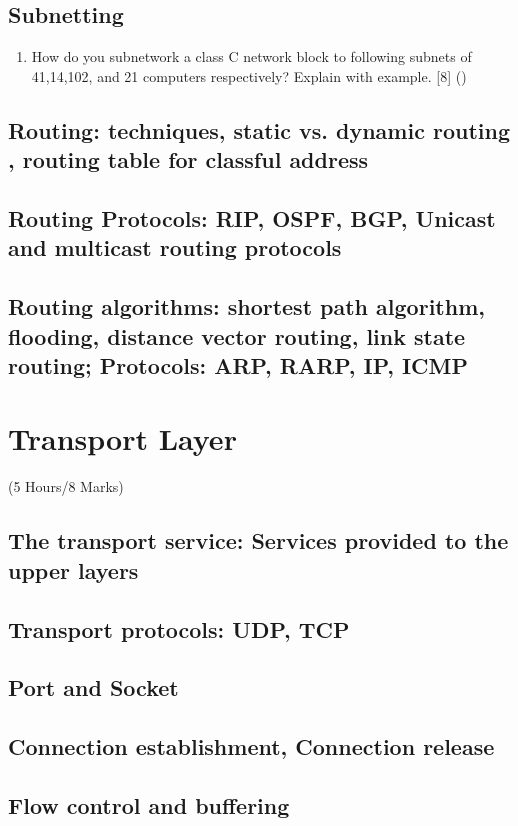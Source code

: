 \documentclass[12pt]{article}
\begin{document}
\subsection{Subnetting}
\begin{enumerate}[noitemsep, topsep=0pt]
	\item How do you subnetwork a class C network block to following subnets of 41,14,102, and 21 computers respectively? Explain with example. \hfill [8] ()
\end{enumerate}

\subsection{Routing: techniques, static vs. dynamic routing , routing table for classful address}
\subsection{Routing Protocols: RIP, OSPF, BGP, Unicast and multicast routing protocols}
\subsection{Routing algorithms: shortest path algorithm, flooding, distance vector routing, link state routing; Protocols: ARP, RARP, IP, ICMP}

\pagebreak
\section{Transport Layer}
\begin{center}(5 Hours/8 Marks)\end{center}
\subsection{The transport service: Services provided to the upper layers}
\subsection{Transport protocols: UDP, TCP}
\subsection{Port and Socket}
\subsection{Connection establishment, Connection release}
\subsection{Flow control and buffering}
\end{document}
